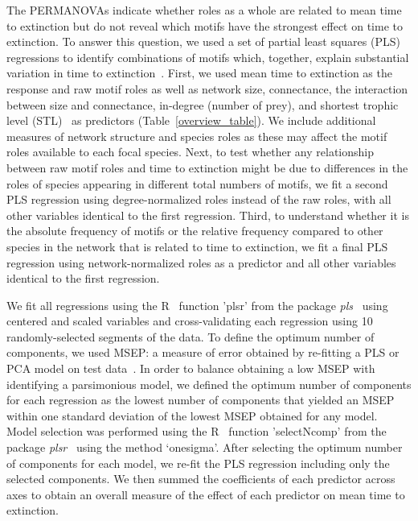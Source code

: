 \documentclass[12pt]{article}
\begin{document}
\begin{spacing}{2.0}
			The PERMANOVAs indicate whether roles as a whole are related to mean time to extinction but do not reveal which motifs have the strongest effect on time to extinction.
			To answer this question, we used a set of partial least squares (PLS) regressions to identify combinations of motifs which, together, explain substantial variation in time to extinction~\citep{Mevik2004,pls}.
			First, we used mean time to extinction as the response and raw motif roles as well as network size, connectance, the interaction between size and connectance, in-degree (number of prey), and shortest trophic level (STL)~\citep{Hairston1993} as predictors (Table~\ref{overview_table}).
			We include additional measures of network structure and species roles as these may affect the motif roles available to each focal species.
			Next, to test whether any relationship between raw motif roles and time to extinction might be due to differences in the roles of species appearing in different total numbers of motifs, we fit a second PLS regression using degree-normalized roles instead of the raw roles, with all other variables identical to the first regression.
			Third, to understand whether it is the absolute frequency of motifs or the relative frequency compared to other species in the network that is related to time to extinction, we fit a final PLS regression using network-normalized roles as a predictor and all other variables identical to the first regression.
			

            We fit all regressions using the R~\citep{R} function 'plsr' from the package \emph{pls}~\citep{pls} using centered and scaled variables and cross-validating each regression using 10 randomly-selected segments of the data.
            To define the optimum number of components, we used MSEP: a measure of error obtained by re-fitting a PLS or PCA model on test data~\citep{Mevik2004}.
            In order to balance obtaining a low MSEP with identifying a parsimonious model, we defined the optimum number of components for each regression as the lowest number of components that yielded an MSEP~\citep{Mevik2004} within one standard deviation of the lowest MSEP obtained for any model.
			Model selection was performed using the R~\citep{R} function 'selectNcomp' from the package \emph{plsr}~\citep{pls} using the method `onesigma'.
			After selecting the optimum number of components for each model, we re-fit the PLS regression including only the selected components. 
			We then summed the coefficients of each predictor across axes to obtain an overall measure of the effect of each predictor on mean time to extinction.



\end{spacing}
\end{document}
